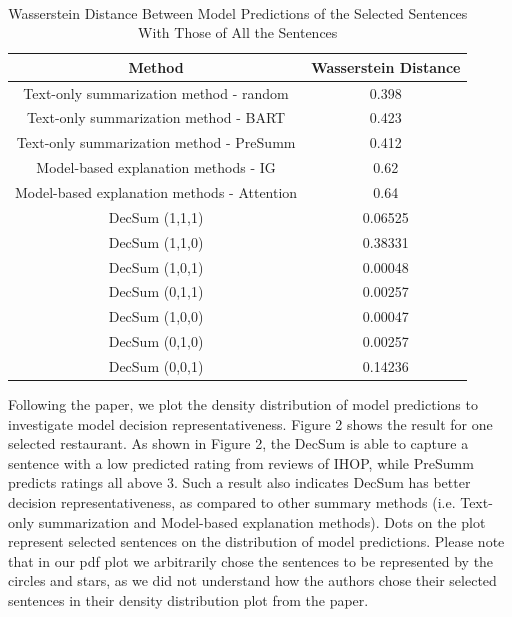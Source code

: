 \documentclass{article}
\begin{document}
\begin{table}[ht]
    \centering
    \caption{Wasserstein Distance Between Model Predictions of the Selected Sentences With Those of All the Sentences} \\
    \begin{tabular}{|c|c|}
        \hline \textbf{Method} & \textbf{Wasserstein Distance} \\
        \hline Text-only summarization method - random & 0.398 \\
        \hline Text-only summarization method - BART & 0.423 \\
        \hline Text-only summarization method - PreSumm & 0.412 \\
        \hline Model-based explanation methods - IG & 0.62 \\
        \hline Model-based explanation methods - Attention & 0.64 \\
        \hline DecSum (1,1,1)   & 0.06525 \\
        \hline DecSum (1,1,0)   & 0.38331 \\
        \hline DecSum (1,0,1)   & 0.00048 \\
        \hline DecSum (0,1,1)   & 0.00257 \\
        \hline DecSum (1,0,0)   & 0.00047 \\
        \hline DecSum (0,1,0)   & 0.00257 \\
        \hline DecSum (0,0,1)   & 0.14236 \\ \hline
    \end{tabular}
\end{table}

Following the paper, we plot the density distribution of model predictions to investigate model decision representativeness. Figure 2 shows the result for one selected restaurant.
As shown in Figure 2, the DecSum is able to capture a sentence with a low predicted rating from reviews of IHOP, while PreSumm predicts ratings all above 3.
Such a result also indicates DecSum has better decision representativeness, as compared to other summary methods  (i.e. Text-only summarization and Model-based explanation methods).
Dots on the plot represent selected sentences on the distribution of model predictions. Please note that in our pdf plot we arbitrarily chose the sentences to be represented by the circles and stars,
as we did not understand how the authors chose their selected sentences in their density distribution plot from the paper.
\end{document}
